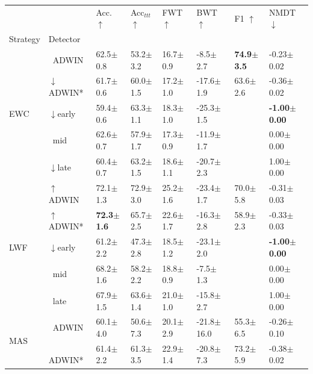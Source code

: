 \begin{tabular}{llllllll}
\toprule
 &  & Acc. $\uparrow$ & Acc$_{ttt}$ $\uparrow$ & FWT $\uparrow$ & BWT $\uparrow$ & F1 $\uparrow$ & NMDT $\downarrow$ \\
Strategy & Detector &  &  &  &  &  &  \\
\midrule
\multirow[t]{5}{*}{EWC} & $\ \;$ADWIN & 62.5\tiny{$\pm$0.8} & 53.2\tiny{$\pm$3.2} & 16.7\tiny{$\pm$0.9} & -8.5\tiny{$\pm$2.7} & \textbf{74.9\tiny{$\pm$3.5}} & -0.23\tiny{$\pm$0.02} \\
 & $\downarrow$ADWIN* & 61.7\tiny{$\pm$0.6} & 60.0\tiny{$\pm$1.5} & 17.2\tiny{$\pm$1.0} & -17.6\tiny{$\pm$1.9} & 63.6\tiny{$\pm$2.6} & -0.36\tiny{$\pm$0.02} \\
 & $\downarrow$early & 59.4\tiny{$\pm$0.6} & 63.3\tiny{$\pm$1.1} & 18.3\tiny{$\pm$1.0} & -25.3\tiny{$\pm$1.5} &  & \textbf{-1.00\tiny{$\pm$0.00}} \\
 & $\ \;$mid & 62.6\tiny{$\pm$0.7} & 57.9\tiny{$\pm$1.7} & 17.3\tiny{$\pm$0.9} & -11.9\tiny{$\pm$1.7} &  & 0.00\tiny{$\pm$0.00} \\
 & $\downarrow$late & 60.4\tiny{$\pm$0.7} & 63.2\tiny{$\pm$1.5} & 18.6\tiny{$\pm$1.1} & -20.7\tiny{$\pm$2.3} &  & 1.00\tiny{$\pm$0.00} \\
\midrule
\multirow[t]{5}{*}{LWF} & $\uparrow$ADWIN & 72.1\tiny{$\pm$1.3} & 72.9\tiny{$\pm$3.0} & 25.2\tiny{$\pm$1.6} & -23.4\tiny{$\pm$1.7} & 70.0\tiny{$\pm$5.8} & -0.31\tiny{$\pm$0.03} \\
 & $\uparrow$ADWIN* & \textbf{72.3\tiny{$\pm$1.6}} & 65.7\tiny{$\pm$2.5} & 22.6\tiny{$\pm$1.7} & -16.3\tiny{$\pm$2.8} & 58.9\tiny{$\pm$2.3} & -0.33\tiny{$\pm$0.03} \\
 & $\downarrow$early & 61.2\tiny{$\pm$2.2} & 47.3\tiny{$\pm$2.8} & 18.5\tiny{$\pm$1.2} & -23.1\tiny{$\pm$2.0} &  & \textbf{-1.00\tiny{$\pm$0.00}} \\
 & $\ \;$mid & 68.2\tiny{$\pm$1.6} & 58.2\tiny{$\pm$2.2} & 18.8\tiny{$\pm$0.9} & -7.5\tiny{$\pm$1.3} &  & 0.00\tiny{$\pm$0.00} \\
 & $\ \;$late & 67.9\tiny{$\pm$1.5} & 63.6\tiny{$\pm$1.4} & 21.0\tiny{$\pm$1.0} & -15.8\tiny{$\pm$2.7} &  & 1.00\tiny{$\pm$0.00} \\
\midrule
\multirow[t]{5}{*}{MAS} & $\ \;$ADWIN & 60.1\tiny{$\pm$4.0} & 50.6\tiny{$\pm$7.3} & 20.1\tiny{$\pm$2.9} & -21.8\tiny{$\pm$16.0} & 55.3\tiny{$\pm$6.5} & -0.26\tiny{$\pm$0.10} \\
 & $\ \;$ADWIN* & 61.4\tiny{$\pm$2.2} & 61.3\tiny{$\pm$3.5} & 22.9\tiny{$\pm$1.4} & -20.8\tiny{$\pm$7.3} & 73.2\tiny{$\pm$5.9} & -0.38\tiny{$\pm$0.02} \\

\end{tabular}

